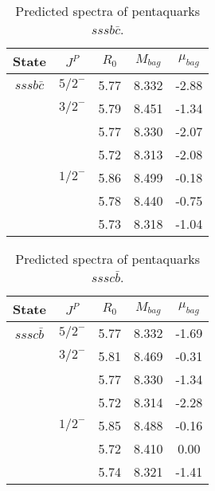 \documentclass[prd,twocolumn,floatfix,nofootinbib]{revtex4}
\begin{document}
\renewcommand{\tabcolsep}{0.5cm}
\renewcommand{\arraystretch}{1.2}
\begin{table*}[!htbp]
    \caption{Predicted spectra of pentaquarks $sssb\bar{c}$.}
    \begin{tabular}{ccccc}
        \hline\hline
        {\rm State} &$J^{P}$ &$R_{0}$ &$M_{bag}$ &$\mu_{bag}$ \\ \hline
        $sssb\bar{c}$
            &${5/2}^{-}$    &5.77   &8.332 &-2.88 \\
            &${3/2}^{-}$    &5.79   &8.451 &-1.34  \\
            &               &5.77   &8.330 &-2.07 \\
            &               &5.72   &8.313 &-2.08  \\
            &${1/2}^{-}$    &5.86   &8.499 &-0.18  \\
            &               &5.78   &8.440 &-0.75  \\
            &               &5.73   &8.318 &-1.04  \\
        \hline\hline
    \end{tabular}
\end{table*}

\renewcommand{\tabcolsep}{0.5cm}
\renewcommand{\arraystretch}{1.2}
\begin{table*}[!htbp]
    \caption{Predicted spectra of pentaquarks $sssc\bar{b}$.}
    \begin{tabular}{ccccc}
        \hline\hline
        {\rm State} &$J^{P}$ &$R_{0}$ &$M_{bag}$ &$\mu_{bag}$ \\ \hline
        $sssc\bar{b}$
            &${5/2}^{-}$    &5.77   &8.332 &-1.69 \\
            &${3/2}^{-}$    &5.81   &8.469 &-0.31 \\
            &               &5.77   &8.330 &-1.34  \\
            &               &5.72   &8.314 &-2.28  \\
            &${1/2}^{-}$    &5.85   &8.488 &-0.16  \\
            &               &5.72   &8.410 &0.00  \\
            &               &5.74   &8.321 &-1.41  \\
        \hline\hline
    \end{tabular}
\end{table*}
\end{document}
